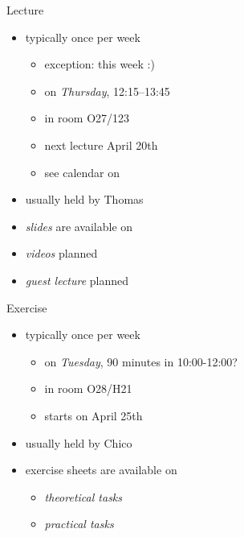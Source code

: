 \begin{frame}{\myframetitle}
	\begin{mycolumns}
		\begin{definition}{Lecture}
			\begin{itemize}
				\item typically once per week
				\begin{itemize}
					\item exception: this week :)
					\item on \emph{Thursday}, 12:15--13:45
					\item in room O27/123
					\item next lecture April 20th
					\item see calendar on \ulmMoodle
				\end{itemize}
				\item usually held by Thomas
				\item \emph{slides} are available on \ulmMoodle
				\item \emph{videos} planned
				\item \emph{guest lecture} planned
			\end{itemize}
		\end{definition}
	\mynextcolumn
		\begin{example}{Exercise}
			\begin{itemize}
				\item typically once per week
				\begin{itemize}
					\item on \emph{Tuesday}, 90 minutes in 10:00-12:00?
					\item in room O28/H21
					\item starts on April 25th
				\end{itemize}
				\item usually held by Chico
				\item exercise sheets are available on \ulmMoodle
				\begin{itemize}
					\item \emph{theoretical tasks}
					\item \emph{practical tasks}
				\end{itemize}
			\end{itemize}
		\end{example}
	\end{mycolumns}
\end{frame}

